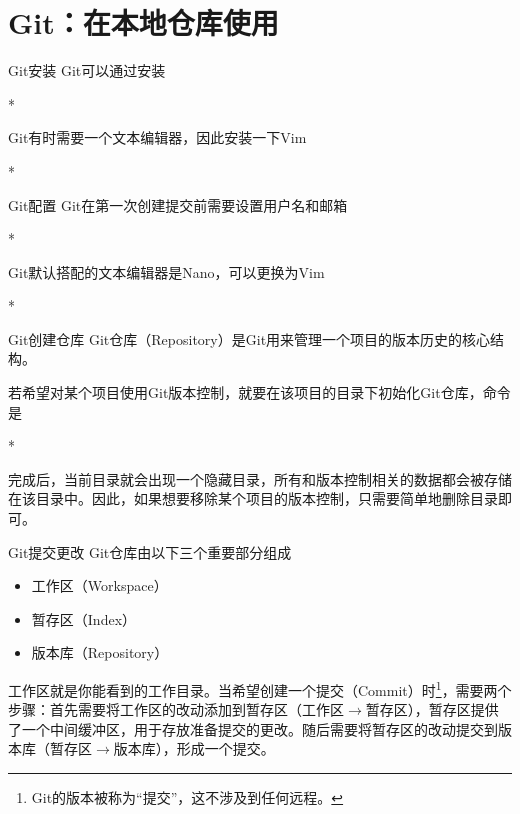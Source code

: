 \section{Git：在本地仓库使用}

\begin{frame}{Git安装}
    Git可以通过安装
    \begin{Code}*
        
    \end{Code}
    Git有时需要一个文本编辑器，因此安装一下Vim
    \begin{Code}*
        
    \end{Code}
\end{frame}

\begin{frame}{Git配置}
    Git在第一次创建提交前需要设置用户名和邮箱
    \begin{Code}*
        
    \end{Code}
    Git默认搭配的文本编辑器是Nano，可以更换为Vim
    \begin{Code}*
        
    \end{Code}
\end{frame}

\begin{frame}{Git创建仓库}
    Git仓库（Repository）是Git用来管理一个项目的版本历史的核心结构。
    
    若希望对某个项目使用Git版本控制，就要在该项目的目录下初始化Git仓库，命令是
    \begin{Code}*
        
    \end{Code}
    完成后，当前目录就会出现一个隐藏目录，所有和版本控制相关的数据都会被存储在该目录中。因此，如果想要移除某个项目的版本控制，只需要简单地删除目录即可。
\end{frame}

\begin{frame}{Git提交更改}
    Git仓库由以下三个重要部分组成
    \begin{itemize}
        \item \alert{工作区}（Workspace）
        \item \alert{暂存区}（Index）
        \item \alert{版本库}（Repository）
    \end{itemize}
    工作区就是你能看到的工作目录。当希望创建一个提交（Commit）时\footnote{Git的版本被称为“提交”，这不涉及到任何远程。}，需要两个步骤：首先需要将工作区的改动添加到暂存区（\alert{工作区}$\to$\alert{暂存区}），暂存区提供了一个中间缓冲区，用于存放准备提交的更改。随后需要将暂存区的改动提交到版本库（\alert{暂存区}$\to$\alert{版本库}），形成一个提交。
\end{frame}

